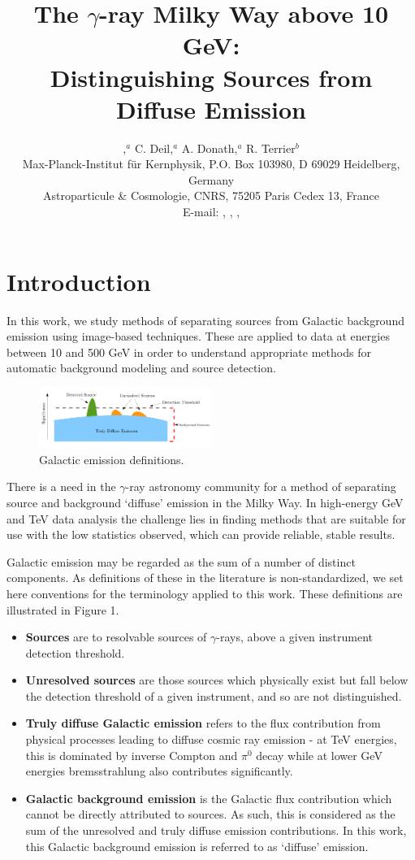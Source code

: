\documentclass{PoS}
\title{The $\gamma$-ray Milky Way above 10 GeV:\\
Distinguishing Sources from Diffuse Emission}
\author{\speaker{E. Owen},$^a$ C. Deil,$^{a}$ A. Donath,$^{a}$ R. Terrier$^{b}$\\
\llap{$^a$}Max-Planck-Institut f\"{u}r Kernphysik, P.O. Box 103980, D
69029 Heidelberg, Germany\\
\llap{$^b$}Astroparticule \& Cosmologie, CNRS, 75205 Paris Cedex 13, France\\
E-mail: \email{ellis.owen@mpi-hd.mpg.de}, \email{christoph.deil@mpi-hd.mpg.de}, \email{axel.donath@mpi-hd.mpg.de}, \email{terrier@apc.univ-paris7.fr}}
\begin{document}
\section{Introduction}

In this work, we study methods of separating sources from Galactic background emission using image-based techniques. These are applied to data at energies between 10 and 500 GeV in order to understand appropriate methods for automatic background modeling and source detection.

\begin{figure}
\vspace{-10pt}
  \centering
      \includegraphics[width=0.5\textwidth]{figures/definitions.png}
  \caption{Galactic emission definitions.}
\vspace{-15pt}
\end{figure}

There is a need in the $\gamma$-ray astronomy community for a method of separating source and background `diffuse' emission in the Milky Way. In high-energy GeV and TeV data analysis the challenge lies in finding methods that are suitable for use with the low statistics observed, which can provide reliable, stable results.

Galactic emission may be regarded as the sum of a number of distinct components. As definitions of these in the literature is non-standardized, we set here conventions for the terminology applied to this work. These definitions are illustrated in Figure 1.

\begin{itemize}[noitemsep,nolistsep]
\item \textbf{Sources} are to resolvable sources of $\gamma$-rays, above a given instrument detection threshold.
\item \textbf{Unresolved sources} are those sources which physically exist but fall below the detection threshold of a given instrument, and so are not distinguished.
\item \textbf{Truly diffuse Galactic emission} refers to the flux contribution from physical processes leading to diffuse cosmic ray emission - at TeV energies, this is dominated by inverse Compton and $\pi^0$ decay while at lower GeV energies bremsstrahlung also contributes significantly.
\item \textbf{Galactic background emission} is the Galactic flux contribution which cannot be directly attributed to sources. As such, this is considered as the sum of the unresolved and truly diffuse emission contributions. In this work, this Galactic background emission is referred to as `diffuse' emission.
\end{itemize}
\end{document}
